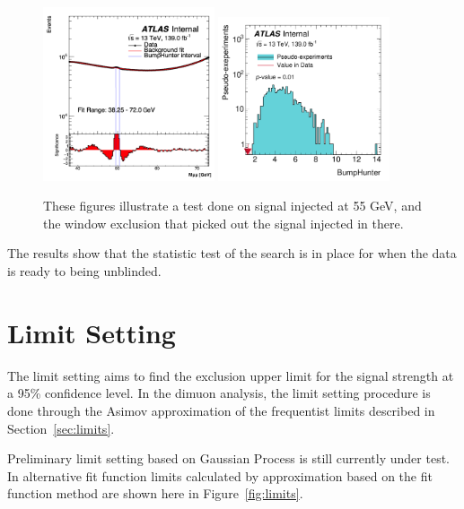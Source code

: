 \begin{figure}[!htb]
    \begin{center}
        \includegraphics[width=0.45\textwidth]{figures/chapter_dimuon/SearchBump}
        \includegraphics[width=0.45\textwidth]{figures/chapter_dimuon/bumpHunterStatPlot_bump}
        \caption{
        These figures illustrate a test done on signal injected at 55 GeV, and the window exclusion that picked out the signal injected in there.}
        \label{fig:searchbump}
    \end{center}
\end{figure}
\FloatBarrier

The results show that the statistic test of the search is in place for when the data is ready to being unblinded.

\section{Limit Setting}
The limit setting aims to find the exclusion upper limit for the signal strength at a 95\% confidence level. In the dimuon analysis, the limit setting procedure is done through the Asimov approximation of the frequentist limits described in Section~\ref{sec:limits}.

Preliminary limit setting based on Gaussian Process is still currently under test. In alternative fit function limits calculated by approximation based on the fit function method are shown here in Figure~\ref{fig:limits}.


